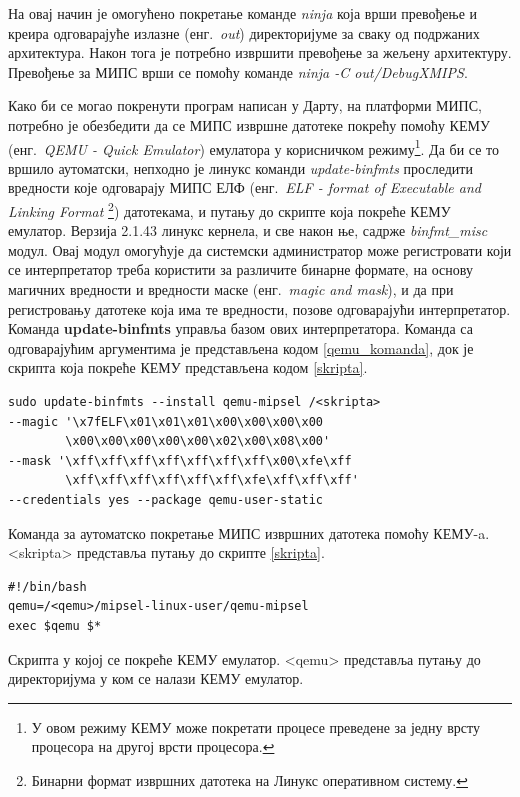 \documentclass[12pt,oneside]{memoir}
\begin{document}
На овај начин је омогућено покретање команде \textit{ninja} која врши превођење и креира одговарајуће излазне (енг.~\textit{out}) директоријуме за сваку од подржаних архитектура. Након тога је потребно извршити превођење за жељену архитектуру. Превођење за МИПС врши се помоћу команде \textit{ninja -C out/DebugXMIPS}.

Како би се могао покренути програм написан у Дарту, на платформи МИПС, потребно је обезбедити да се МИПС извршне датотеке покрећу помоћу КЕМУ (енг.~\textit{QEMU - Quick Emulator}) емулатора у корисничком режиму\footnote{У овом режиму КЕМУ може покретати процесе преведене за једну врсту процесора на другој врсти процесора.}. Да би се то вршило аутоматски, непходно је линукс команди \textit{update-binfmts} проследити вредности које одговарају МИПС ЕЛФ (енг.~\textit{ELF - format of Executable and Linking Format} \footnote{Бинарни формат извршних датотека на Линукс оперативном систему.}) датотекама, и путању до скрипте која покреће КЕМУ емулатор. Верзија 2.1.43 линукс кернела, и све након ње, садрже \textit{binfmt\_misc} модул. Овај модул омогућује да системски администратор може регистровати који се интерпретатор треба користити за различите бинарне формате, на основу магичних вредности и вредности маске (енг.~\textit{magic and mask}), и да при регистровању датотеке која има те вредности, позове одговарајући интерпретатор. Команда \textbf{update-binfmts} управља базом ових интерпретатора. Команда са одговарајућим аргументима је представљена кодом \ref{qemu_komanda}, док је скрипта која покреће КЕМУ представљена кодом \ref{skripta}. \\

\begin{listing}
\centering
\begin{verbatim}
sudo update-binfmts --install qemu-mipsel /<skripta>
--magic '\x7fELF\x01\x01\x01\x00\x00\x00\x00
        \x00\x00\x00\x00\x00\x02\x00\x08\x00'
--mask '\xff\xff\xff\xff\xff\xff\xff\x00\xfe\xff
        \xff\xff\xff\xff\xff\xff\xfe\xff\xff\xff'
--credentials yes --package qemu-user-static
\end{verbatim}
\caption{Команда за аутоматско покретање МИПС извршних датотека помоћу КЕМУ-a. <skripta> представља путању до скрипте \ref{skripta}.}
\label{qemu_komanda}
\end{listing}


\begin{listing}
\centering
\begin{verbatim}
#!/bin/bash
qemu=/<qemu>/mipsel-linux-user/qemu-mipsel
exec $qemu $*
\end{verbatim}
\caption{Скрипта у којој се покреће КЕМУ емулатор. <qemu> представља путању до директоријума у ком се налази КЕМУ емулатор.}
\label{skripta}
\end{listing}
\end{document}
